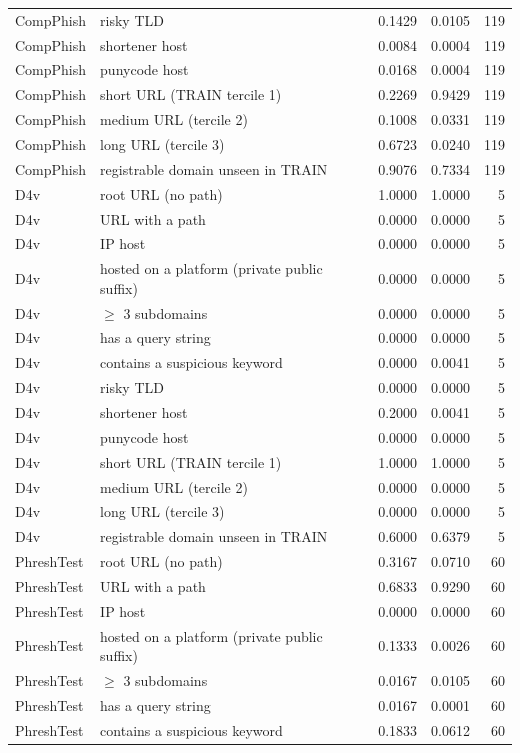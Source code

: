 \begin{table}[t]
\begin{tabular}{llrrr}
CompPhish & risky TLD & 0.1429 & 0.0105 & 119 \\
CompPhish & shortener host & 0.0084 & 0.0004 & 119 \\
CompPhish & punycode host & 0.0168 & 0.0004 & 119 \\
CompPhish & short URL (TRAIN tercile 1) & 0.2269 & 0.9429 & 119 \\
CompPhish & medium URL (tercile 2) & 0.1008 & 0.0331 & 119 \\
CompPhish & long URL (tercile 3) & 0.6723 & 0.0240 & 119 \\
CompPhish & registrable domain unseen in TRAIN & 0.9076 & 0.7334 & 119 \\
D4v & root URL (no path) & 1.0000 & 1.0000 & 5 \\
D4v & URL with a path & 0.0000 & 0.0000 & 5 \\
D4v & IP host & 0.0000 & 0.0000 & 5 \\
D4v & hosted on a platform (private public suffix) & 0.0000 & 0.0000 & 5 \\
D4v & $\geq$ 3 subdomains & 0.0000 & 0.0000 & 5 \\
D4v & has a query string & 0.0000 & 0.0000 & 5 \\
D4v & contains a suspicious keyword & 0.0000 & 0.0041 & 5 \\
D4v & risky TLD & 0.0000 & 0.0000 & 5 \\
D4v & shortener host & 0.2000 & 0.0041 & 5 \\
D4v & punycode host & 0.0000 & 0.0000 & 5 \\
D4v & short URL (TRAIN tercile 1) & 1.0000 & 1.0000 & 5 \\
D4v & medium URL (tercile 2) & 0.0000 & 0.0000 & 5 \\
D4v & long URL (tercile 3) & 0.0000 & 0.0000 & 5 \\
D4v & registrable domain unseen in TRAIN & 0.6000 & 0.6379 & 5 \\
PhreshTest & root URL (no path) & 0.3167 & 0.0710 & 60 \\
PhreshTest & URL with a path & 0.6833 & 0.9290 & 60 \\
PhreshTest & IP host & 0.0000 & 0.0000 & 60 \\
PhreshTest & hosted on a platform (private public suffix) & 0.1333 & 0.0026 & 60 \\
PhreshTest & $\geq$ 3 subdomains & 0.0167 & 0.0105 & 60 \\
PhreshTest & has a query string & 0.0167 & 0.0001 & 60 \\
PhreshTest & contains a suspicious keyword & 0.1833 & 0.0612 & 60 \\

\end{tabular}
\end{table}

